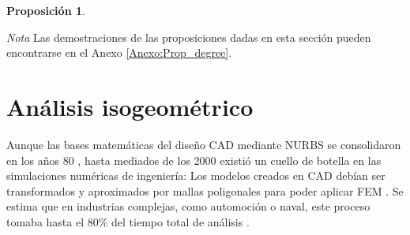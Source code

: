 \documentclass[11pt]{book}
\newcommand{\clearemptydoublepage}{\newpage{\pagestyle{empty}\cleardoublepage}}
\theoremstyle{plain} %
\newtheorem{proposicion}[teorema]{Proposición}
\theoremstyle{definition} %
\theoremstyle{definition} %
\begin{document}
\begin{proposicion}
        

        
\end{proposicion}
\noindent
\textit{Nota} Las demostraciones de las proposiciones dadas en esta sección pueden encontrarse en el Anexo \ref{Anexo:Prop_degree}.

\clearemptydoublepage

\chapter{Análisis isogeométrico}\label{chap3}

\vspace{-0.8cm}

Aunque las bases matemáticas del diseño CAD mediante NURBS se consolidaron en los años 80 
\cite{farin_history_2002, brechner_developing_2024}, hasta mediados de los 2000 existió un cuello
de botella en las simulaciones numéricas de ingeniería: Los modelos creados en CAD debían ser transformados y
aproximados por mallas poligonales para poder aplicar FEM \cite{hughes_isogeometric_2005}.
Se estima que en industrias complejas, como automoción o naval, este proceso tomaba hasta el 80\%
del tiempo total de análisis \cite{hughes_isogeometric_2005, cottrell_isogeometric_2009}.
\end{document}
